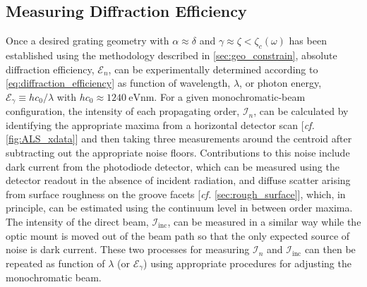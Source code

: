\subsection{Measuring Diffraction Efficiency}\label{sec:measure_efficiency}
Once a desired grating geometry with $\alpha \approx \delta$ and $\gamma \approx \zeta < \zeta_c (\omega)$ has been established using the methodology described in \cref{sec:geo_constrain}, absolute diffraction efficiency, $\mathscr{E}_n$, can be experimentally determined according to \cref{eq:diffraction_efficiency} as function of wavelength, $\lambda$, or photon energy, $\mathcal{E}_{\gamma} \equiv h c_0 / \lambda$ with $h c_0 \approx \SI{1240}{\electronvolt\nm}$. 
For a given monochromatic-beam configuration, the intensity of each propagating order, $\mathcal{I}_n$, can be calculated by identifying the appropriate maxima from a horizontal detector scan [\emph{cf.\@} \cref{fig:ALS_xdata}] and then taking three measurements around the centroid after subtracting out the appropriate noise floors. 
Contributions to this noise include dark current from the photodiode detector, which can be measured using the detector readout in the absence of incident radiation, and diffuse scatter arising from surface roughness on the groove facets [\emph{cf.\@} \cref{sec:rough_surface}], which, in principle, can be estimated using the continuum level in between order maxima. 
The intensity of the direct beam, $\mathcal{I}_{\text{inc}}$, can be measured in a similar way while the optic mount is moved out of the beam path so that the only expected source of noise is dark current. 
These two processes for measuring $\mathcal{I}_n$ and $\mathcal{I}_{\text{inc}}$ can then be repeated as function of $\lambda$ (or $\mathcal{E}_{\gamma}$) using appropriate procedures for adjusting the monochromatic beam. 

